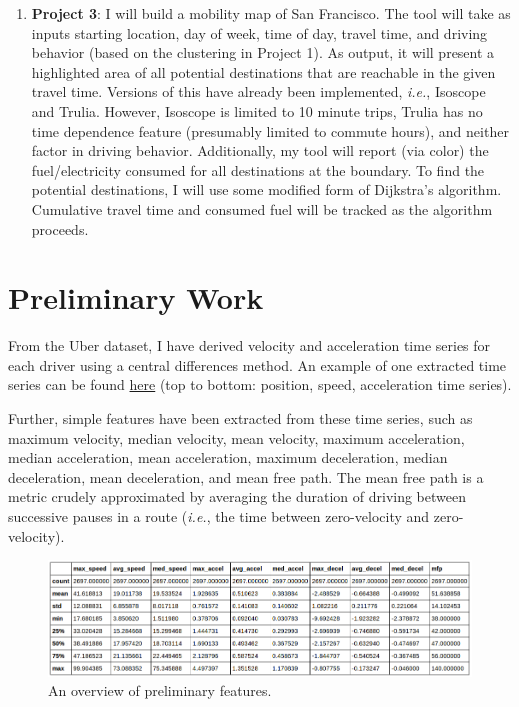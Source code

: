 \documentclass[12pt]{article}
\begin{document}
\begin{enumerate}
\item \textbf{Project 3}: I will build a mobility map of San Francisco. The tool will take as inputs starting location, day of week, time of day, travel time, and driving behavior (based on the clustering in Project 1). As output, it will present a highlighted area of all potential destinations that are reachable in the given travel time. Versions of this have already been implemented, \textit{i.e.}, Isoscope and Trulia. However, Isoscope is limited to 10 minute trips, Trulia has no time dependence feature (presumably limited to commute hours), and neither factor in driving behavior. Additionally, my tool will report (via color) the fuel/electricity consumed for all destinations at the boundary. To find the potential destinations, I will use some modified form of Dijkstra's algorithm. Cumulative travel time and consumed fuel will be tracked as the algorithm proceeds.

\end{enumerate}

\section{Preliminary Work}

From the Uber dataset, I have derived velocity and acceleration time series for each driver using a central differences method. An example of one extracted time series can be found \href{https://b7097c28bb33c303afec66e136e388566fb53b52.googledrive.com/host/0Bz6ioWtHYtNJVjJacklTdHQ2cGM/}{here} (top to bottom: position, speed, acceleration time series).

Further, simple features have been extracted from these time series, such as maximum velocity, median velocity, mean velocity, maximum acceleration, median acceleration, mean acceleration, maximum deceleration, median deceleration, mean deceleration, and mean free path. The mean free path is a metric crudely approximated by averaging the duration of driving between successive pauses in a route (\textit{i.e.}, the time between zero-velocity and zero-velocity).

\begin{figure}[hbtp]
\caption{\label{fig:features}An overview of preliminary features.}
\begin{center}
\includegraphics[width=5.5in]{feature_describe.png}
\end{center}
\end{figure}
\end{document}
